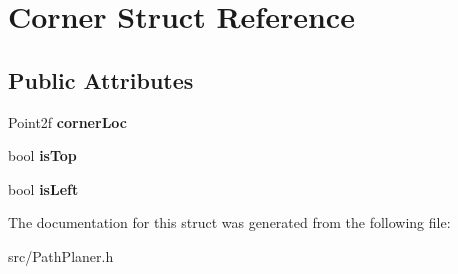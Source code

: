 \hypertarget{struct_corner}{}\section{Corner Struct Reference}
\label{struct_corner}
\subsection*{Public Attributes}
\begin{DoxyCompactItemize}
\item 
Point2f {\bfseries corner\+Loc}\hypertarget{struct_corner_af082d91db8a37b3aac2c8c8577625add}{}\label{struct_corner_af082d91db8a37b3aac2c8c8577625add}

\item 
bool {\bfseries is\+Top}\hypertarget{struct_corner_adb56a2da4910a446b69ef9486b934d58}{}\label{struct_corner_adb56a2da4910a446b69ef9486b934d58}

\item 
bool {\bfseries is\+Left}\hypertarget{struct_corner_ae028a8251dc8e261a4c0a2a211c02633}{}\label{struct_corner_ae028a8251dc8e261a4c0a2a211c02633}

\end{DoxyCompactItemize}


The documentation for this struct was generated from the following file\+:\begin{DoxyCompactItemize}
\item 
src/Path\+Planer.\+h\end{DoxyCompactItemize}

